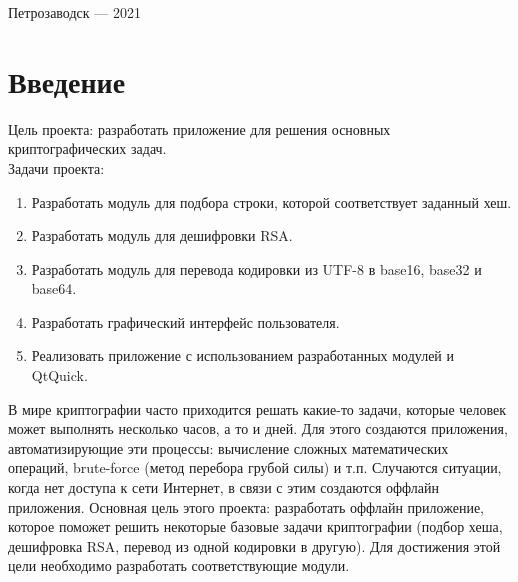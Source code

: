 \documentclass[a4paper,12pt]{article}
\begin{document}
\vfill

\begin{center}
\large
    Петрозаводск --- 2021
\end{center}



\newpage

\hypersetup{hidelinks}
\tableofcontents

\newpage
\section*{Введение}


Цель проекта: разработать приложение для решения основных криптографических задач. \\

Задачи проекта: 
\begin{enumerate}
    \item Разработать модуль для подбора строки, которой соответствует заданный хеш.
    \item Разработать модуль для дешифровки RSA.
    \item Разработать модуль для перевода кодировки из UTF-8 в base16, base32 и base64.
    \item Разработать графический интерфейс пользователя.
    \item Реализовать приложение с использованием разработанных модулей и QtQuick.
\end{enumerate}

В мире криптографии часто приходится решать какие-то задачи, которые человек может выполнять несколько часов, а то и дней. Для этого создаются приложения, автоматизирующие эти процессы: вычисление сложных математических операций, brute-force (метод перебора грубой силы) и т.п. Случаются ситуации, когда нет доступа к сети Интернет, в связи с этим создаются оффлайн приложения. Основная цель этого проекта: разработать оффлайн приложение, которое поможет решить некоторые базовые задачи криптографии (подбор хеша, дешифровка RSA, перевод из одной кодировки в другую). Для достижения этой цели необходимо разработать соответствующие модули. 

\end{document}
